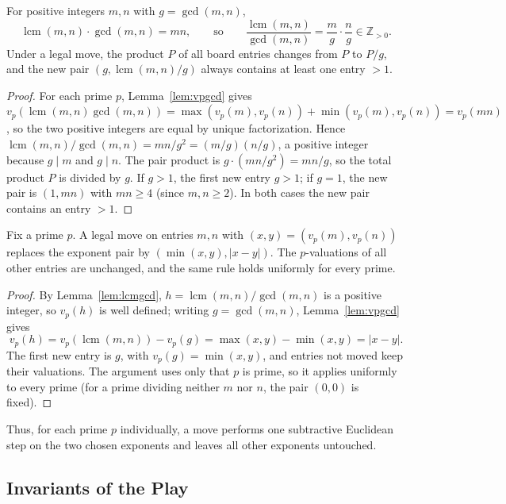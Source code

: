 \documentclass{article}
\DeclareMathOperator{\lcm}{lcm}
\begin{document}
\begin{lemma}[Identity $\lcm\cdot\gcd=mn$]\label{lem:lcmgcd}
For positive integers $m,n$ with $g=\gcd(m,n)$,
\[
\lcm(m,n)\cdot\gcd(m,n)=mn,\qquad\text{so}\qquad
\frac{\lcm(m,n)}{\gcd(m,n)}=\frac{m}{g}\cdot\frac{n}{g}\in\mathbb{Z}_{>0}.
\]
Under a legal move, the product $P$ of all board entries changes from $P$ to
$P/g$, and the new pair $(g,\lcm(m,n)/g)$ always contains at least one entry
$>1$.
\end{lemma}
\begin{proof}
For each prime $p$, Lemma~\ref{lem:vpgcd} gives
$v_p(\lcm(m,n)\gcd(m,n))=\max(v_p(m),v_p(n))+\min(v_p(m),v_p(n))=v_p(mn)$, so
the two positive integers are equal by unique factorization. Hence
$\lcm(m,n)/\gcd(m,n)=mn/g^2=(m/g)(n/g)$, a positive integer because $g\mid m$
and $g\mid n$. The pair product is $g\cdot(mn/g^2)=mn/g$, so the total product
$P$ is divided by $g$. If $g>1$, the first new entry $g>1$; if $g=1$, the new
pair is $(1,mn)$ with $mn\geq 4$ (since $m,n\geq 2$). In both cases the new
pair contains an entry $>1$.
\end{proof}

\begin{lemma}\label{lem:expdyn}
Fix a prime $p$. A legal move on entries $m,n$ with $(x,y)=(v_p(m),v_p(n))$
replaces the exponent pair by $(\min(x,y),|x-y|)$. The $p$-valuations of all
other entries are unchanged, and the same rule holds uniformly for every prime.
\end{lemma}
\begin{proof}
By Lemma~\ref{lem:lcmgcd}, $h=\lcm(m,n)/\gcd(m,n)$ is a positive integer, so
$v_p(h)$ is well defined; writing $g=\gcd(m,n)$, Lemma~\ref{lem:vpgcd} gives
\[
v_p(h)=v_p(\lcm(m,n))-v_p(g)=\max(x,y)-\min(x,y)=|x-y|.
\]
The first new entry is $g$, with $v_p(g)=\min(x,y)$, and entries not moved keep
their valuations. The argument uses only that $p$ is prime, so it applies
uniformly to every prime (for a prime dividing neither $m$ nor $n$, the pair
$(0,0)$ is fixed).
\end{proof}

Thus, for each prime $p$ individually, a move performs one subtractive
Euclidean step on the two chosen exponents and leaves all other exponents
untouched.

\subsection{Invariants of the Play}
\end{document}

